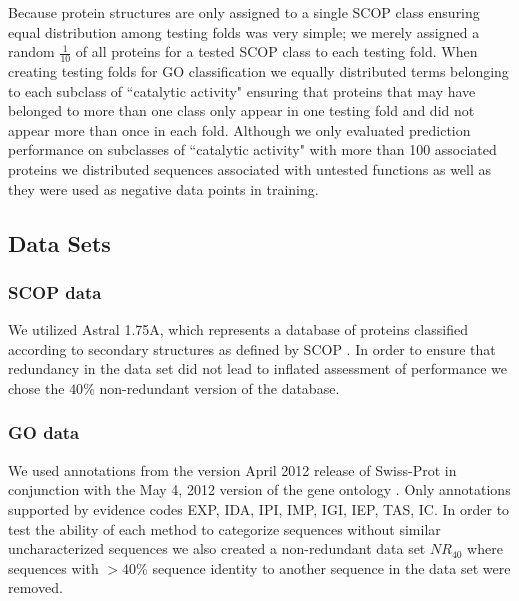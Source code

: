 Because protein structures are only assigned to a single SCOP class ensuring equal distribution among testing folds was very simple; we merely assigned a random $\frac{1}{10}$ of all proteins for a tested SCOP class to each testing fold.  When creating testing folds for GO classification we equally distributed terms belonging to each subclass of ``catalytic activity" ensuring that proteins that may have belonged to more than one class only appear in one testing fold and did not appear more than once in each fold.  Although we only evaluated prediction performance on subclasses of ``catalytic activity" with more than 100 associated proteins we distributed sequences associated with untested functions as well as they were used as negative data points in training.

\subsection{Data Sets}


\subsubsection{SCOP data}
We utilized Astral 1.75A, which represents a database of proteins classified according to secondary structures as defined by SCOP \citep{andreeva2004scop}.  In order to ensure that redundancy in the data set did not lead to inflated assessment of performance we chose the $40\%$ non-redundant version of the database. 


\subsubsection{GO data}

We used annotations from the version April 2012 release of Swiss-Prot \citep{uniprot2012} in conjunction with the  May 4, 2012 version of the gene ontology \citep{Ashburner2000}.  Only annotations supported by evidence codes EXP, IDA, IPI, IMP, IGI, IEP, TAS, IC. In order to test the ability of each method to categorize sequences without similar uncharacterized sequences we also created a non-redundant data set $NR_{40}$ where sequences with $>40\%$ sequence identity to another sequence in the data set were removed.  



